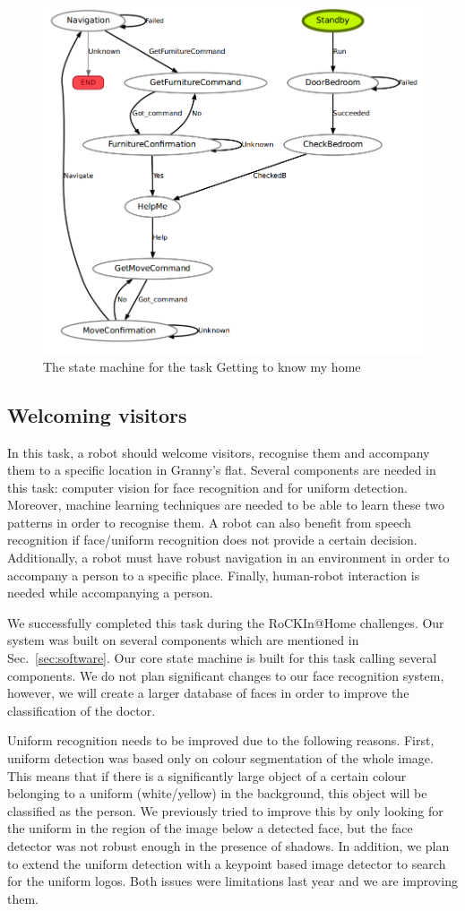 \begin{figure}[!htb]
\centering
\includegraphics[width=3.in]{statemachine_t1.png}
\caption{The state machine for the task Getting to know my home}
\label{fig:st1}
\end{figure}

\subsection{Welcoming visitors}

In this task, a robot should welcome visitors, recognise them and accompany them to a specific location in Granny's flat. Several components are needed in this task: computer vision for face recognition and for uniform detection. Moreover, machine learning techniques are needed to be able to learn these two patterns in order to recognise them. A robot can also benefit from speech recognition if face/uniform recognition does not provide a certain decision. Additionally, a robot must have robust navigation in an environment in order to accompany a person to a specific place. 
Finally, human-robot interaction is needed while accompanying a person.

We successfully completed this task during the RoCKIn@Home challenges. Our system was built on several components which are mentioned in Sec.~\ref{sec:software}. 
Our core state machine is built for this task calling several components. 
We do not plan significant changes to our face recognition system, however, we will create a larger database of faces in order to improve the classification of the doctor.

Uniform recognition needs to be improved due to the following reasons.
First, uniform detection was based only on colour segmentation of the whole image. This means that if there is a significantly large object of a certain colour belonging to a uniform (white/yellow) in the background, this object will be classified as the person. We previously tried to improve this by only looking for the uniform in the region of the image below a detected face, but the face detector was not robust enough in the presence of shadows.
In addition, we plan to extend the uniform detection with a keypoint based image detector to search for the uniform logos.
Both issues were limitations last year and we are improving them.  


